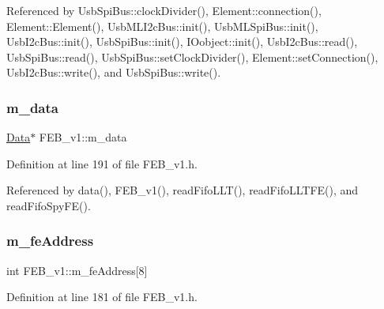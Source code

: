 Referenced by Usb\+Spi\+Bus\+::clock\+Divider(), Element\+::connection(), Element\+::\+Element(), Usb\+M\+L\+I2c\+Bus\+::init(), Usb\+M\+L\+Spi\+Bus\+::init(), Usb\+I2c\+Bus\+::init(), Usb\+Spi\+Bus\+::init(), I\+Oobject\+::init(), Usb\+I2c\+Bus\+::read(), Usb\+Spi\+Bus\+::read(), Usb\+Spi\+Bus\+::set\+Clock\+Divider(), Element\+::set\+Connection(), Usb\+I2c\+Bus\+::write(), and Usb\+Spi\+Bus\+::write().

\mbox{\label{classFEB__v1_a1c9dbc3660021dba1f58666d0097abb0}} 
\subsubsection{\texorpdfstring{m\+\_\+data}{m\_data}}
{\footnotesize\ttfamily \hyperlink{classData}{Data}$\ast$ F\+E\+B\+\_\+v1\+::m\+\_\+data\hspace{0.3cm}{\ttfamily [private]}}



Definition at line 191 of file F\+E\+B\+\_\+v1.\+h.



Referenced by data(), F\+E\+B\+\_\+v1(), read\+Fifo\+L\+L\+T(), read\+Fifo\+L\+L\+T\+F\+E(), and read\+Fifo\+Spy\+F\+E().

\mbox{\label{classFEB__v1_a4e1945c2d5b434125f375e9d0fc6d99f}} 
\subsubsection{\texorpdfstring{m\+\_\+fe\+Address}{m\_feAddress}}
{\footnotesize\ttfamily int F\+E\+B\+\_\+v1\+::m\+\_\+fe\+Address\mbox{[}8\mbox{]}\hspace{0.3cm}{\ttfamily [private]}}



Definition at line 181 of file F\+E\+B\+\_\+v1.\+h.



